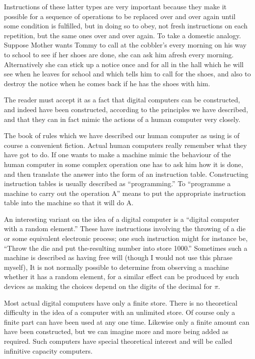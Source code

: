\documentclass[10pt,twoside,openright]{memoir}
\begin{document}
Instructions of these latter types are very important because they make it possible for a sequence of operations to be replaced over and over again until some condition is fulfilled, but in doing so to obey, not fresh instructions on each repetition, but the same ones over and over again. To take a domestic analogy. Suppose Mother wants Tommy to call at the cobbler's every morning on his way to school to see if her shoes are done, she can ask him afresh every morning. Alternatively she can stick up a notice once and for all in the hall which he will see when he leaves for school and which tells him to call for the shoes, and also to destroy the notice when he comes back if he has the shoes with him.

The reader must accept it as a fact that digital computers can be constructed, and indeed have been constructed, according to the principles we have described, and that they can in fact mimic the actions of a human computer very closely.

The book of rules which we have described our human computer as using is of course a convenient fiction. Actual human computers really remember what they have got to do. If one wants to make a machine mimic the behaviour of the human computer in some complex operation one has to ask him how it is done, and then translate the answer into the form of an instruction table. Constructing instruction tables is usually described as ``programming.'' To ``programme a machine to carry out the operation A'' means to put the appropriate instruction table into the machine so that it will do A.

An interesting variant on the idea of a digital computer is a ``digital computer with a random element.'' These have instructions involving the throwing of a die or some equivalent electronic process; one such instruction might for instance be, ``Throw the die and put the-resulting number into store 1000.'' Sometimes such a machine is described as having free will (though I would not use this phrase myself), It is not normally possible to determine from observing a machine whether it has a random element, for a similar effect can be produced by such devices as making the choices depend on the digits of the decimal for $\pi$.

Most actual digital computers have only a finite store. There is no theoretical difficulty in the idea of a computer with an unlimited store. Of course only a finite part can have been used at any one time. Likewise only a finite amount can have been constructed, but we can imagine more and more being added as required. Such computers have special theoretical interest and will be called infinitive capacity computers.
\end{document}
